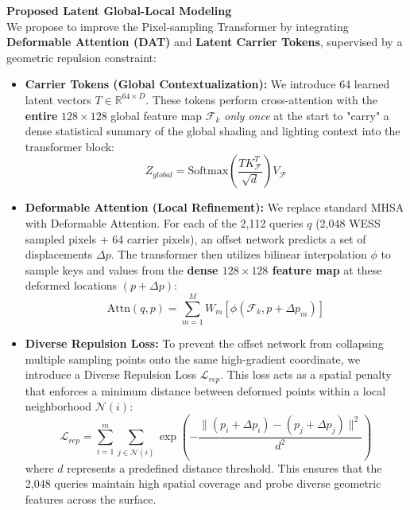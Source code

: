 \documentclass[Main.tex]{subfiles}
\begin{document}
\textbf{Proposed Latent Global-Local Modeling} \\
We propose to improve the Pixel-sampling Transformer by integrating \textbf{Deformable Attention (DAT)} and \textbf{Latent Carrier Tokens}, supervised by a geometric repulsion constraint:
\begin{itemize}
    \item \textbf{Carrier Tokens (Global Contextualization):} We introduce 64 learned latent vectors $T \in \mathbb{R}^{64 \times D}$. These tokens perform cross-attention with the \textbf{entire} $128 \times 128$ global feature map $\mathcal{F}_k$ \textit{only once} at the start to "carry" a dense statistical summary of the global shading and lighting context into the transformer block:
    \begin{equation}
        Z_{global} = \text{Softmax}\left(\frac{T K_{\mathcal{F}}^T}{\sqrt{d}}\right) V_{\mathcal{F}}
    \end{equation}
    \item \textbf{Deformable Attention (Local Refinement):} We replace standard MHSA with Deformable Attention. For each of the 2,112 queries $q$ (2,048 WESS sampled pixels + 64 carrier pixels), an offset network predicts a set of displacements $\Delta p$. The transformer then utilizes bilinear interpolation $\phi$ to sample keys and values from the \textbf{dense $128 \times 128$ feature map} at these deformed locations $(p + \Delta p)$:
    \begin{equation}
        \text{Attn}(q, p) = \sum_{m=1}^{M} W_m \left[ \phi(\mathcal{F}_k, p + \Delta p_m) \right]
    \end{equation}
    \item \textbf{Diverse Repulsion Loss:} To prevent the offset network from collapsing multiple sampling points onto the same high-gradient coordinate, we introduce a Diverse Repulsion Loss $\mathcal{L}_{rep}$. This loss acts as a spatial penalty that enforces a minimum distance between deformed points within a local neighborhood $\mathcal{N}(i)$:
    \begin{equation}
        \mathcal{L}_{rep} = \sum_{i=1}^{m} \sum_{j \in \mathcal{N}(i)} \exp \left( - \frac{\| (p_i + \Delta p_i) - (p_j + \Delta p_j) \|^2}{d^2} \right)
    \end{equation}
    where $d$ represents a predefined distance threshold. This ensures that the 2,048 queries maintain high spatial coverage and probe diverse geometric features across the surface.
\end{itemize}
\end{document}
